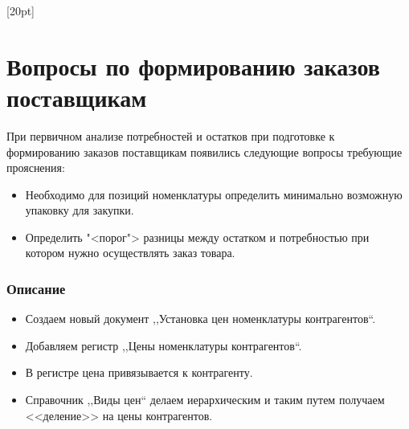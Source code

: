 [20pt]
\section{Вопросы по формированию заказов поставщикам}
\reversemarginpar


 При первичном анализе потребностей и остатков при подготовке к формированию заказов поставщикам появились следующие вопросы требующие прояснения:
\begin{itemize}	
	\item Необходимо для позиций номенклатуры определить минимально возможную упаковку для закупки.
	\item Определить "<порог"> разницы между остатком и  потребностью при котором нужно осуществлять заказ товара.
	
	
	

\end{itemize}


\reversemarginpar




\subsubsection {Описание}
\begin{itemize}	
\item Создаем новый документ ,,Установка цен номенклатуры контрагентов``.
\item Добавляем регистр ,,Цены номенклатуры контрагентов``.
\item В регистре цена привязывается к контрагенту.
\item Справочник ,,Виды цен`` делаем иерархическим и таким путем получаем <<деление>> на цены контрагентов.
\end{itemize}
